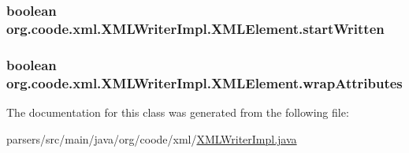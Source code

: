 \hypertarget{classorg_1_1coode_1_1xml_1_1_x_m_l_writer_impl_1_1_x_m_l_element_a0764dcd4756a8cbb67a9645f7e6841d6}{
\subsubsection[{start\-Written}]{\setlength{\rightskip}{0pt plus 5cm}boolean org.\-coode.\-xml.\-X\-M\-L\-Writer\-Impl.\-X\-M\-L\-Element.\-start\-Written\hspace{0.3cm}{\ttfamily [private]}}}\label{classorg_1_1coode_1_1xml_1_1_x_m_l_writer_impl_1_1_x_m_l_element_a0764dcd4756a8cbb67a9645f7e6841d6}
\hypertarget{classorg_1_1coode_1_1xml_1_1_x_m_l_writer_impl_1_1_x_m_l_element_a5cf8076013ee1155f65b7110b1412a17}{
\subsubsection[{wrap\-Attributes}]{\setlength{\rightskip}{0pt plus 5cm}boolean org.\-coode.\-xml.\-X\-M\-L\-Writer\-Impl.\-X\-M\-L\-Element.\-wrap\-Attributes\hspace{0.3cm}{\ttfamily [private]}}}\label{classorg_1_1coode_1_1xml_1_1_x_m_l_writer_impl_1_1_x_m_l_element_a5cf8076013ee1155f65b7110b1412a17}


The documentation for this class was generated from the following file\-:\begin{DoxyCompactItemize}
\item 
parsers/src/main/java/org/coode/xml/\hyperlink{_x_m_l_writer_impl_8java}{X\-M\-L\-Writer\-Impl.\-java}\end{DoxyCompactItemize}
